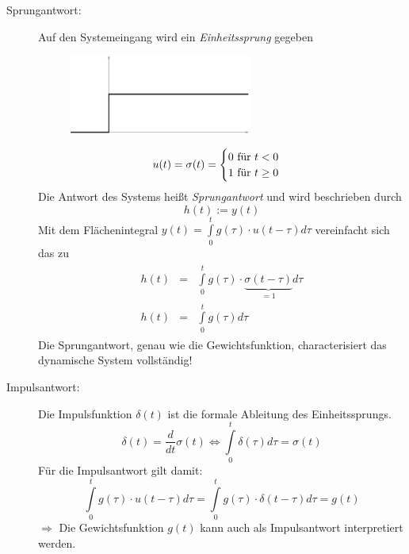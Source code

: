 \message{ !name(Mitschrieb_SysRegel.tex)}\documentclass[12pt,a4paper,ngerman]{scrartcl}
\begin{document}
\begin{description}
\item[Sprungantwort:] Auf den Systemeingang wird ein \emph{Einheitssprung} gegeben

  \begin{figure}[H]
    \centering
    \includegraphics[width=6cm]{sysregel_einheitssprung}
  \end{figure}
  \begin{equation*}
    u(t)=\sigma (t) =\begin{cases} 0 $ für $t<0\\1 $ für $ t \geq 0\end{cases}
  \end{equation*}
Die Antwort des Systems heißt \emph{Sprungantwort} und wird beschrieben durch
\begin{equation*}
  h(t):=y(t)
\end{equation*}
Mit dem Flächenintegral $y(t)=\int\limits_0^t{g(\tau)\cdot u(t-\tau)d\tau}$ vereinfacht sich das zu
\begin{align*}
  \begin{array}{lll}
    h(t)&=&\int\limits_0^t{g(\tau)\cdot \underbrace{\sigma (t-\tau)}_{=1}d\tau}\\
    h(t)&=&\int\limits_0^t{g(\tau)d\tau}  
  \end{array}
\end{align*}
Die Sprungantwort, genau wie die Gewichtsfunktion, characterisiert das dynamische System vollständig!
\item[Impulsantwort: ] Die Impulsfunktion $\delta (t)$ ist die formale Ableitung des Einheitssprungs.
  \begin{equation*}
    \delta (t)=\frac{d}{dt}\sigma (t) \Leftrightarrow \int\limits_0^t{\delta(\tau)d\tau =\sigma(t)}
  \end{equation*}
Für die Impulsantwort gilt damit:
\begin{equation*}
  \int\limits_0^t{g(\tau)\cdot u(t-\tau)d\tau} =\int\limits_0^t{g(\tau)\cdot \delta(t-\tau)d\tau }=g(t)
\end{equation*}
$\Rightarrow$ Die Gewichtsfunktion $g(t)$ kann auch als Impulsantwort interpretiert werden.

\end{description}
\end{document}
